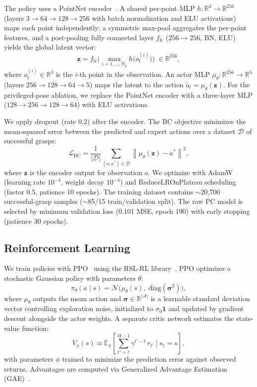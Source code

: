 \documentclass[conference]{IEEEtran}
\begin{document}
The policy uses a PointNet encoder~\cite{qi2017pointnet}.
A shared per-point MLP $h: \mathbb{R}^3 \to \mathbb{R}^{256}$ (layers $3 \!\to\! 64 \!\to\! 128 \!\to\! 256$ with batch normalization and ELU activations) maps each point independently; a symmetric max-pool aggregates the per-point features, and a post-pooling fully connected layer $f_{\mathrm{fc}}$ ($256 \!\to\! 256$, BN, ELU) yields the global latent vector:
\begin{equation}
    \mathbf{z} = f_{\mathrm{fc}}\!\Big(\max_{i=1,\ldots,N_p} h\!\big(o_t^{(i)}\big)\Big) \;\in \mathbb{R}^{256},
\end{equation}
where $o_t^{(i)} \in \mathbb{R}^3$ is the $i$-th point in the observation.
An actor MLP $\mu_\theta: \mathbb{R}^{256} \to \mathbb{R}^{5}$ (layers $256 \!\to\! 128 \!\to\! 64 \!\to\! 5$) maps the latent to the action $\tilde{a}_t = \mu_\theta(\mathbf{z})$.
For the privileged-pose ablation, we replace the PointNet encoder with a three-layer MLP ($128 \!\to\! 256 \!\to\! 128 \!\to\! 64$) with ELU activations.

We apply dropout (rate 0.2) after the encoder.
The BC objective minimizes the mean-squared error between the predicted and expert actions over a dataset $\mathcal{D}$ of successful grasps:
\begin{equation}
    \mathcal{L}_{\text{BC}} = \frac{1}{|\mathcal{D}|}\sum_{(o,a^*)\in\mathcal{D}} \left\| \mu_\theta(\mathbf{z}) - a^* \right\|^2,
\end{equation}
where $\mathbf{z}$ is the encoder output for observation $o$.
We optimize with AdamW~\cite{loshchilov2019adamw} (learning rate $10^{-4}$, weight decay $10^{-4}$) and ReduceLROnPlateau scheduling (factor 0.5, patience 10 epochs).
The training dataset contains $\sim$20{,}700 successful-grasp samples ($\sim$85/15 train/validation split). The raw PC model is selected by minimum validation loss (0.101 MSE, epoch 190) with early stopping (patience 30 epochs).

\subsection{Reinforcement Learning}
\label{sec:rl}
We train policies with PPO~\cite{schulman2017ppo} using the RSL-RL library~\cite{rudin2022learning}.
PPO optimizes a stochastic Gaussian policy with parameters $\theta$:
\begin{equation}
    \pi_\theta(a \mid s) = \mathcal{N}\!\big(\mu_\theta(s),\;\mathrm{diag}(\bm{\sigma}^2)\big),
\end{equation}
where $\mu_\theta$ outputs the mean action and $\bm{\sigma} \in \mathbb{R}^{|\mathcal{A}|}$ is a learnable standard deviation vector controlling exploration noise, initialized to $\sigma_0 \mathbf{1}$ and updated by gradient descent alongside the actor weights.
A separate critic network estimates the state-value function:
\begin{equation}
    V_\phi(s) \approx \mathbb{E}_\pi\!\left[\sum_{t'=t}^{H-1} \gamma^{t'-t}\, r_{t'} \;\Big|\; s_t = s\right],
\end{equation}
with parameters $\phi$ trained to minimize the prediction error against observed returns.
Advantages are computed via Generalized Advantage Estimation (GAE)~\cite{schulman2017ppo}.
\end{document}
